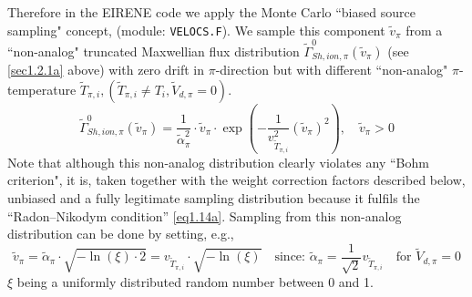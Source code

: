 Therefore in the EIRENE code we apply the Monte Carlo  ``biased source
sampling" concept, (module: \lstinline|VELOCS.F|).
We sample this component ${\tilde{v}}_{\pi}$ from a ``non-analog" truncated
Maxwellian flux distribution $\tilde\Gamma^0_{Sh,ion,\pi}(\tilde v_{\pi})$ (see
\cref{sec1.2.1a} above) with zero drift in $\pi$-direction but with different
``non-analog" $\pi$- temperature ${\tilde{T}}_{\pi,i}, ({\tilde{T}}_{\pi,i}
  \ne T_i, {\tilde{V}} _{d,\pi} = 0 )$.
\begin{equation}
  \tilde\Gamma^0_{Sh,ion,\pi}
  (\tilde v_\pi) = \frac{1}{\tilde \alpha^2_\pi}	 \cdot	 \tilde v_{\pi}  \cdot
  \exp \left ( - \frac{1}{v_{\tilde T_{\pi,i}}^2} (\tilde v_\pi )^2  \right ),
  \quad \tilde v_{\pi} > 0
\end{equation}
Note that although this non-analog
distribution clearly violates any ``Bohm criterion", it is, taken together with
the weight correction factors described below, unbiased and a fully legitimate
sampling distribution because it fulfils the ``Radon--Nikodym condition''
\cref{eq1.14a}.
Sampling from this non-analog distribution can be done by setting, e.g.,
\begin{equation}
  \tilde{v}_{\pi} = {\tilde{\alpha}}_{\pi}   \cdot   \sqrt{-\ln(
    \xi )  \cdot 2} = v_{\tilde T_{\pi,i}} \cdot   \sqrt{-\ln( \xi )}  \quad
  \mbox{since: \ } \tilde{\alpha}_{\pi} =\frac{1}{\sqrt{2}} v_{\tilde T_{\pi,i}}
  \quad \mbox{for \ } \tilde{V}_{d,\pi} = 0 \label{eq1.26}
\end{equation}
$\xi$
being a uniformly distributed random number between 0 and 1.

\smallskip

